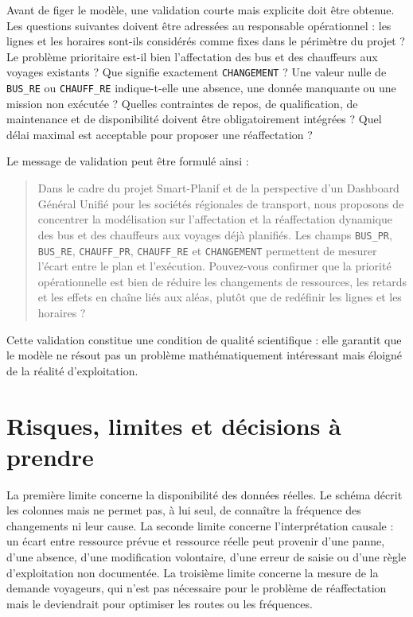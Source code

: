 \documentclass[12pt,a4paper]{article}
\newcommand{\code}[1]{\texttt{#1}}
\begin{document}
Avant de figer le modèle, une validation courte mais explicite doit être obtenue. Les questions suivantes doivent être adressées au responsable opérationnel : les lignes et les horaires sont-ils considérés comme fixes dans le périmètre du projet ? Le problème prioritaire est-il bien l’affectation des bus et des chauffeurs aux voyages existants ? Que signifie exactement \code{CHANGEMENT} ? Une valeur nulle de \code{BUS\_RE} ou \code{CHAUFF\_RE} indique-t-elle une absence, une donnée manquante ou une mission non exécutée ? Quelles contraintes de repos, de qualification, de maintenance et de disponibilité doivent être obligatoirement intégrées ? Quel délai maximal est acceptable pour proposer une réaffectation ?

Le message de validation peut être formulé ainsi :

\begin{quote}
Dans le cadre du projet Smart-Planif et de la perspective d’un Dashboard Général Unifié pour les sociétés régionales de transport, nous proposons de concentrer la modélisation sur l’affectation et la réaffectation dynamique des bus et des chauffeurs aux voyages déjà planifiés. Les champs \code{BUS\_PR}, \code{BUS\_RE}, \code{CHAUFF\_PR}, \code{CHAUFF\_RE} et \code{CHANGEMENT} permettent de mesurer l’écart entre le plan et l’exécution. Pouvez-vous confirmer que la priorité opérationnelle est bien de réduire les changements de ressources, les retards et les effets en chaîne liés aux aléas, plutôt que de redéfinir les lignes et les horaires ?
\end{quote}

Cette validation constitue une condition de qualité scientifique : elle garantit que le modèle ne résout pas un problème mathématiquement intéressant mais éloigné de la réalité d’exploitation.

\section{Risques, limites et décisions à prendre}

La première limite concerne la disponibilité des données réelles. Le schéma décrit les colonnes mais ne permet pas, à lui seul, de connaître la fréquence des changements ni leur cause. La seconde limite concerne l’interprétation causale : un écart entre ressource prévue et ressource réelle peut provenir d’une panne, d’une absence, d’une modification volontaire, d’une erreur de saisie ou d’une règle d’exploitation non documentée. La troisième limite concerne la mesure de la demande voyageurs, qui n’est pas nécessaire pour le problème de réaffectation mais le deviendrait pour optimiser les routes ou les fréquences.
\end{document}
